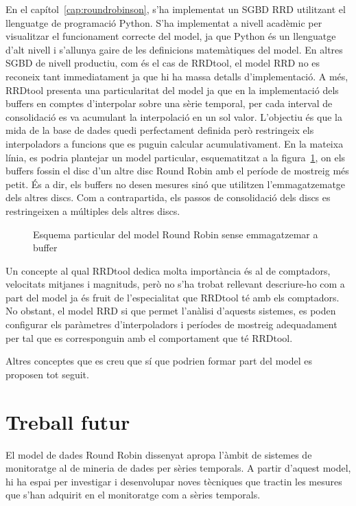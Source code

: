 En el capítol~\ref{cap:roundrobinson}, s'ha implementat un SGBD RRD utilitzant el llenguatge de programació Python. S'ha implementat a nivell acadèmic per visualitzar el funcionament correcte del model, ja que Python és un llenguatge d'alt nivell i s'allunya gaire de les definicions matemàtiques del model.
En altres SGBD de nivell productiu, com és el cas de RRDtool, el model RRD no es reconeix tant immediatament ja que hi ha massa detalls d'implementació. A més, RRDtool presenta una particularitat del model ja que en la implementació dels buffers en comptes d'interpolar sobre una sèrie temporal, per cada interval de consolidació es va acumulant la interpolació en un sol valor. L'objectiu és que la mida de la base de dades quedi perfectament definida però restringeix els interpoladors a funcions que es puguin calcular acumulativament.
En la mateixa línia, es podria plantejar un model particular, esquematitzat a la figura~\ref{fig:model:esquemanobuffer}, on els buffers fossin el disc d'un altre disc Round Robin amb el període de mostreig més petit. És a dir, els buffers no desen mesures sinó que utilitzen l'emmagatzematge dels altres discs. Com a contrapartida, els passos de consolidació dels discs es restringeixen a múltiples dels altres discs. 
\begin{figure}[tb]
\centering
\setlength{\unitlength}{0.4mm}

\caption{Esquema particular del model Round Robin sense emmagatzemar a buffer}
\label{fig:model:esquemanobuffer}
\end{figure}




Un concepte al qual RRDtool dedica molta importància és al de comptadors, velocitats mitjanes i magnituds, però no s'ha trobat rellevant descriure-ho com a part del model ja és fruit de l'especialitat que RRDtool té amb els comptadors. No obstant, el model RRD si que permet l'anàlisi  d'aquests sistemes, es poden configurar els paràmetres d'interpoladors i períodes de mostreig adequadament per tal que es corresponguin amb el comportament que té RRDtool.

Altres conceptes que es creu que sí que podrien formar part del model es proposen tot seguit.


\section{Treball futur}
\label{sec:futur}

El model de dades Round Robin dissenyat apropa l'àmbit de sistemes de monitoratge al de mineria de dades per sèries temporals. A partir d'aquest model, hi ha espai per investigar i desenvolupar noves tècniques que tractin les mesures que s'han adquirit en el monitoratge com a sèries temporals.


